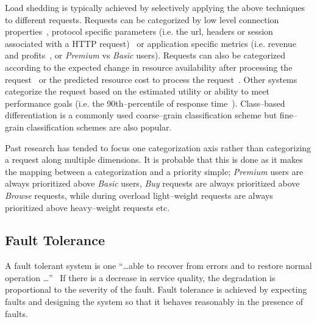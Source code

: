 \documentclass[conference]{IEEEtran}
\begin{document}
Load shedding is typically achieved by selectively applying the above techniques to different requests. Requests can be categorized by low level connection properties~\cite{Voigt:2001qe}, protocol specific parameters (i.e. the url, headers or session associated with a HTTP request)~\cite{Cherkasova:2002yb,Voigt:2001qe} or application specific metrics (i.e. revenue and profits~\cite{Menasec:2000ty}, or \emph{Premium} vs \emph{Basic} users). Requests can also be categorized according to the expected change in resource availability after processing the request~\cite{Behren03Capriccio} or the predicted resource cost to process the request~\cite{Crovella99Alpha}. Other systems categorize the request based on the estimated utility\cite{Zhou06RequestAware} or ability to meet performance goals (i.e. the 90th--percentile of response time~\cite{welsh03Adaptive}). Class--based differentiation is a commonly used coarse--grain classification scheme but fine--grain classification schemes are also popular.

Past research has tended to focus one categorization axis rather than categorizing a request along multiple dimensions. It is probable that this is done as it makes the mapping between a categorization and a priority simple; \emph{Premium} users are always prioritized above \emph{Basic} users, \emph{Buy} requests are always prioritized above \emph{Browse} requests, while during overload light--weight requests are always prioritized above heavy--weight requests etc. 

\subsection{Fault Tolerance}


A fault tolerant system is one ``\ldots able to recover from errors and to restore normal operation \ldots''~\cite{Renzel:03:ErrorHandling} If there is a decrease in service quality, the degradation is proportional to the severity of the fault. Fault tolerance is achieved by expecting faults and designing the system so that it behaves reasonably in the presence of faults.
\end{document}
